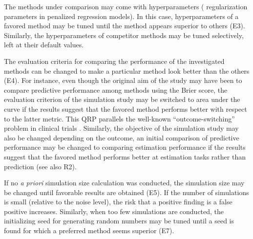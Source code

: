 \documentclass[a4paper, 11pt]{article}
\begin{document}
The methods under comparison may come with hyperparameters (\eg
regularization parameters in penalized regression models). In this case, 
hyperparameters of a favored method may be tuned until the method appears
superior to others (E3). Similarly, the hyperparameters of competitor methods
may be tuned selectively, \eg left at their default values.

The evaluation criteria for comparing the performance of the investigated
methods can be changed to make a particular method look better than the others (E4). 
For instance, even though the original aim of the study may have been to compare
predictive performance among methods using the Brier score, the evaluation criterion
of the simulation study may be switched to area under the curve if the results 
suggest that the favored method performs better with respect to the latter metric.
This QRP parallels the well-known ``outcome-switching'' problem in clinical trials
\citep{Altman2017}.
Similarly, the objective of the simulation study may also be changed depending on the 
outcome, \eg an initial comparison of predictive performance may be changed to comparing 
estimation performance if the results suggest that the favored method performs 
better at estimation tasks rather than prediction (see also R2).

If no \emph{a priori} simulation size calculation was conducted, the simulation size may
be changed until favorable results are obtained (E5).
If the number of simulations is small (relative to the noise level), the risk that a
positive finding is a false positive increases. 
Similarly, when too few simulations are conducted, the initializing seed for generating 
random numbers may be tuned until a seed is found for which a preferred method seems
superior (E7).
\end{document}
